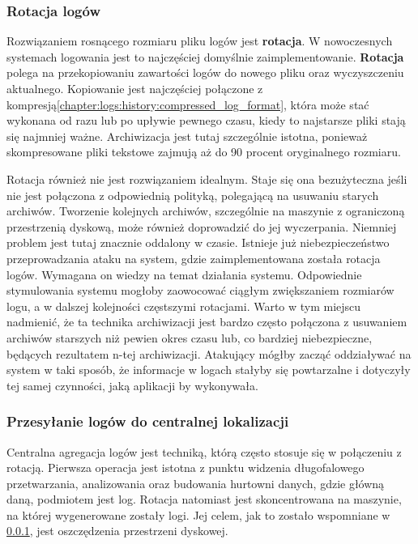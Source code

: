         \subsubsection{Rotacja logów}
        \label{chapter:logs:collecting:rotation}
        Rozwiązaniem rosnącego rozmiaru pliku logów jest \textbf{rotacja}. W nowoczesnych systemach logowania
        jest to najczęściej domyślnie zaimplementowanie. \textbf{Rotacja} polega na przekopiowaniu 
        zawartości logów do nowego pliku oraz wyczyszczeniu aktualnego. Kopiowanie jest najczęściej połączone
        z kompresją\ref{chapter:logs:history:compressed_log_format}, która może stać wykonana od razu lub po upływie pewnego czasu, kiedy to najstarsze
        pliki stają się najmniej ważne. Archiwizacja jest tutaj szczególnie istotna, ponieważ
        skompresowane pliki tekstowe zajmują aż do 90 procent oryginalnego rozmiaru.
        
        Rotacja również nie jest rozwiązaniem idealnym. Staje się ona bezużyteczna jeśli nie jest połączona
        z odpowiednią polityką, polegającą na usuwaniu starych archiwów. Tworzenie kolejnych archiwów,
        szczególnie na maszynie z ograniczoną przestrzenią dyskową, może również doprowadzić do jej wyczerpania.
        Niemniej problem jest tutaj znacznie oddalony w czasie. Istnieje już niebezpieczeństwo przeprowadzania
        ataku na system, gdzie zaimplementowana została rotacja logów. Wymagana on wiedzy na temat działania systemu.
        Odpowiednie stymulowania systemu mogłoby zaowocować ciągłym zwiększaniem rozmiarów logu, a w dalszej kolejności
        częstszymi rotacjami. Warto w tym miejscu nadmienić, że ta technika archiwizacji jest bardzo często
        połączona z usuwaniem archiwów starszych niż pewien okres czasu lub, co bardziej niebezpieczne, będących
        rezultatem n-tej archiwizacji. Atakujący mógłby zacząć oddziaływać na system w taki sposób, że informacje
        w logach stałyby się powtarzalne i dotyczyły tej samej czynności, jaką aplikacji by wykonywała.
        
        \subsubsection{Przesyłanie logów do centralnej lokalizacji}
        \label{chapter:logs:collecting:central_location}
        Centralna agregacja logów jest techniką, którą często stosuje się w połączeniu z rotacją.
        Pierwsza operacja jest istotna z punktu widzenia długofalowego przetwarzania, analizowania oraz
        budowania hurtowni danych, gdzie główną daną, podmiotem jest log. Rotacja natomiast jest skoncentrowana
        na maszynie, na której wygenerowane zostały logi. Jej celem, jak to zostało wspomniane w \ref{chapter:logs:collecting:rotation},
        jest oszczędzenia przestrzeni dyskowej.
    